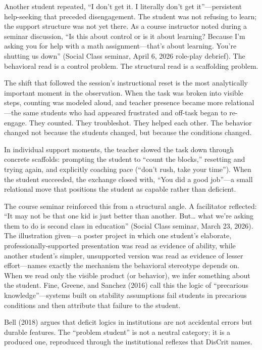 \documentclass[12pt]{article}
\begin{document}
Another student repeated, ``I don't get it. I literally don't get it''---persistent help-seeking that preceded disengagement. The student was not refusing to learn; the support structure was not yet there. As a course instructor noted during a seminar discussion, ``Is this about control or is it about learning? Because I'm asking you for help with a math assignment---that's about learning. You're shutting us down'' (Social Class seminar, April 6, 2026 role-play debrief). The behavioral read is a control problem. The structural read is a scaffolding problem.

The shift that followed the session's instructional reset is the most analytically important moment in the observation. When the task was broken into visible steps, counting was modeled aloud, and teacher presence became more relational---the same students who had appeared frustrated and off-task began to re-engage. They counted. They troubleshot. They helped each other. The behavior changed not because the students changed, but because the conditions changed.

In individual support moments, the teacher slowed the task down through concrete scaffolds: prompting the student to ``count the blocks,'' resetting and trying again, and explicitly coaching pace (``don't rush, take your time''). When the student succeeded, the exchange closed with, ``You did a good job''---a small relational move that positions the student as capable rather than deficient.

The course seminar reinforced this from a structural angle. A facilitator reflected: ``It may not be that one kid is just better than another. But\ldots{} what we're asking them to do is second class in education'' (Social Class seminar, March 23, 2026). The illustration given---a poster project in which one student's elaborate, professionally-supported presentation was read as evidence of ability, while another student's simpler, unsupported version was read as evidence of lesser effort---names exactly the mechanism the behavioral stereotype depends on. When we read only the visible product (or behavior), we infer something about the student. Fine, Greene, and Sanchez (2016) call this the logic of ``precarious knowledge''---systems built on stability assumptions fail students in precarious conditions and then attribute that failure to the student.

Bell (2018) argues that deficit logics in institutions are not accidental errors but durable features. The ``problem student'' is not a neutral category; it is a produced one, reproduced through the institutional reflexes that DisCrit names.
\end{document}
